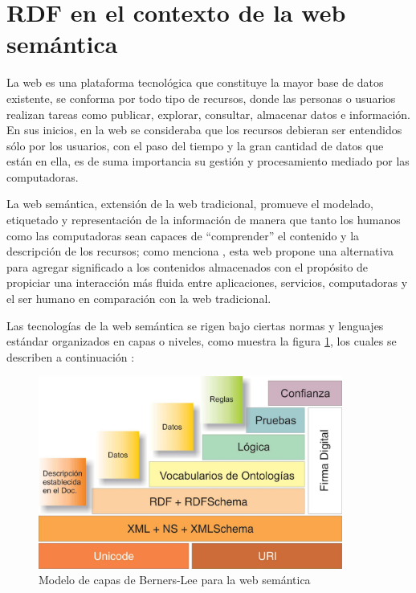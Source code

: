 \section{RDF en el contexto de la web sem\'antica}
\label{RDF}

La web es una plataforma tecnol\'ogica que constituye la mayor base de datos existente, se conforma por todo tipo de recursos, donde las personas o usuarios realizan tareas como publicar, explorar, consultar, almacenar datos e informaci\'on. En sus inicios, en la web se consideraba que los recursos debieran ser entendidos s\'olo por los usuarios, con el paso del tiempo y la gran cantidad de datos que est\'an en ella, es de suma importancia su gesti\'on y procesamiento mediado por las computadoras. \newline

La web sem\'antica, extensi\'on de la web tradicional, promueve el modelado, etiquetado y representaci\'on de la informaci\'on de manera que tanto los humanos como las computadoras sean capaces de ``comprender'' el contenido y la descripci\'on de los recursos; como menciona \cite{IntroBDRDF}, esta web propone una alternativa para agregar significado a los contenidos almacenados con el prop\'osito de propiciar una interacci\'on m\'as fluida entre aplicaciones, servicios, computadoras y el ser humano en comparaci\'on con la web tradicional. \newline

Las tecnolog\'ias de la web sem\'antica se rigen bajo ciertas normas y lenguajes est\'andar organizados en capas o niveles, como muestra la figura \ref{ModeloWebSemantica}, los cuales se describen a continuaci\'on \cite{IntroBDRDF}:

\begin{figure}[!ht]
    \centering
    \includegraphics[width=10cm]{figures/ModeloCapasWebSemantica.jpg} %
    \caption{Modelo de capas de Berners-Lee para la web sem\'antica\cite{WebSemanticaSciELO}} %
    \label{ModeloWebSemantica}
\end{figure}

